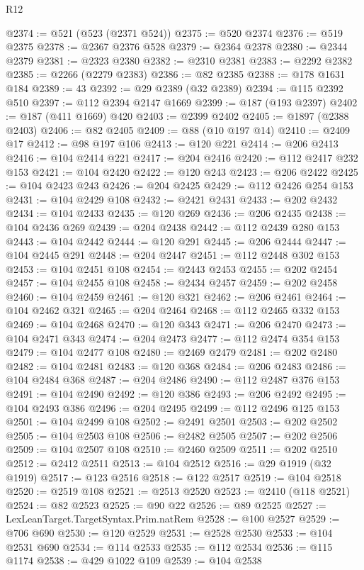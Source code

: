 \begin{lexlean}{R12}
\begin{coremodule}
@2374 := @521 (@523 (@2371 @524))
@2375 := @520 @2374
@2376 := @519 @2375
@2378 := @2367 @2376 @528
@2379 := @2364 @2378
@2380 := @2344 @2379
@2381 := @2323 @2380
@2382 := @2310 @2381
@2383 := @2292 @2382
@2385 := @2266 (@2279 @2383)
@2386 := @82 @2385
@2388 := @178 @1631 @184
@2389 := 43
@2392 := @29 @2389 (@32 @2389)
@2394 := @115 @2392 @510
@2397 := @112 @2394 @2147 @1669
@2399 := @187 (@193 @2397)
@2402 := @187 (@411 @1669) @420
@2403 := @2399 @2402
@2405 := @1897 (@2388 @2403)
@2406 := @82 @2405
@2409 := @88 (@10 @197 @14)
@2410 := @2409 @17
@2412 := @98 @197 @106
@2413 := @120 @221
@2414 := @206 @2413
@2416 := @104 @2414 @221
@2417 := @204 @2416
@2420 := @112 @2417 @232 @153
@2421 := @104 @2420
@2422 := @120 @243
@2423 := @206 @2422
@2425 := @104 @2423 @243
@2426 := @204 @2425
@2429 := @112 @2426 @254 @153
@2431 := @104 @2429 @108
@2432 := @2421 @2431
@2433 := @202 @2432
@2434 := @104 @2433
@2435 := @120 @269
@2436 := @206 @2435
@2438 := @104 @2436 @269
@2439 := @204 @2438
@2442 := @112 @2439 @280 @153
@2443 := @104 @2442
@2444 := @120 @291
@2445 := @206 @2444
@2447 := @104 @2445 @291
@2448 := @204 @2447
@2451 := @112 @2448 @302 @153
@2453 := @104 @2451 @108
@2454 := @2443 @2453
@2455 := @202 @2454
@2457 := @104 @2455 @108
@2458 := @2434 @2457
@2459 := @202 @2458
@2460 := @104 @2459
@2461 := @120 @321
@2462 := @206 @2461
@2464 := @104 @2462 @321
@2465 := @204 @2464
@2468 := @112 @2465 @332 @153
@2469 := @104 @2468
@2470 := @120 @343
@2471 := @206 @2470
@2473 := @104 @2471 @343
@2474 := @204 @2473
@2477 := @112 @2474 @354 @153
@2479 := @104 @2477 @108
@2480 := @2469 @2479
@2481 := @202 @2480
@2482 := @104 @2481
@2483 := @120 @368
@2484 := @206 @2483
@2486 := @104 @2484 @368
@2487 := @204 @2486
@2490 := @112 @2487 @376 @153
@2491 := @104 @2490
@2492 := @120 @386
@2493 := @206 @2492
@2495 := @104 @2493 @386
@2496 := @204 @2495
@2499 := @112 @2496 @125 @153
@2501 := @104 @2499 @108
@2502 := @2491 @2501
@2503 := @202 @2502
@2505 := @104 @2503 @108
@2506 := @2482 @2505
@2507 := @202 @2506
@2509 := @104 @2507 @108
@2510 := @2460 @2509
@2511 := @202 @2510
@2512 := @2412 @2511
@2513 := @104 @2512
@2516 := @29 @1919 (@32 @1919)
@2517 := @123 @2516
@2518 := @122 @2517
@2519 := @104 @2518
@2520 := @2519 @108
@2521 := @2513 @2520
@2523 := @2410 (@118 @2521)
@2524 := @82 @2523
@2525 := @90 @22
@2526 := @89 @2525
@2527 := LexLeanTarget.TargetSyntax.Prim.natRem
@2528 := @100 @2527
@2529 := @706 @690
@2530 := @120 @2529
@2531 := @2528 @2530
@2533 := @104 @2531 @690
@2534 := @114 @2533
@2535 := @112 @2534
@2536 := @115 @1174
@2538 := @429 @1022 @109
@2539 := @104 @2538

\end{coremodule}
\end{lexlean}
